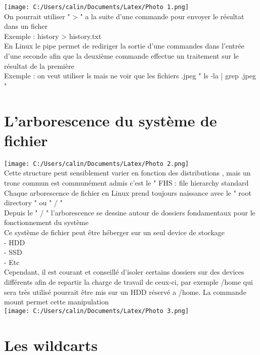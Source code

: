 \documentclass[11pt,a4peper]{article}
\begin{document}
\texttt{[image: C:/Users/calin/Documents/Latex/Photo 1.png]}\\

On pourrait utiliser " > " a la suite d’une commande pour envoyer le résultat dans un ficher\\
Exemple : history > history.txt\\

En Linux le pipe permet de rediriger la sortie d’une commandes dans l’entrée d’une seconde afin que la deuxième commande effectue un traitement sur le résultat de la première \\
Exemple : on veut utiliser ls mais ne voir que les fichiers .jpeg   "  ls -la | grep .jpeg "\\

\section{L’arborescence du système de fichier}

\texttt{[image: C:/Users/calin/Documents/Latex/Photo 2.png]} \\
Cette structure peut sensiblement varier en fonction des distributions , mais un tronc commun est communément admis c’est le " FHS : file hierarchy standard \\

Chaque arborescence de fichier en Linux prend toujours naissance avec le " root directory " ou " / " \\

Depuis le " / " l’arborescence se dessine autour de dossiers fondamentaux pour le fonctionnement du système \\

Ce système de fichier peut être héberger sur un seul device de stockage\\
- HDD\\
- SSD\\
- Etc\\
Cependant, il est courant et conseillé d’isoler certains dossiers sur des devices différents afin de repartir la charge de travail de ceux-ci, par exemple /home qui sera très utilisé pourrait être mis sur un HDD réservé a /home. La commande mount permet cette manipulation\\

\texttt{[image: C:/Users/calin/Documents/Latex/Photo 3.png]} 

\section{Les wildcarts}
\end{document}
